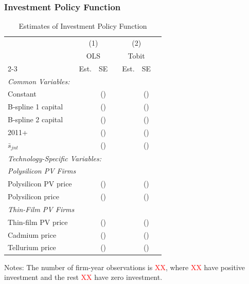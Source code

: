 \documentclass[12pt]{article}
\begin{document}
\subsubsection{Investment Policy Function}
\begin{table}[!h]
\centering
\caption{Estimates of Investment Policy Function}
\label{tab:est_investment_policy_func}
\begin{threeparttable}
\begin{tabularx}{0.75\textwidth}{Xcccccc}
\toprule
 & \multicolumn{2}{c}{(1)} && \multicolumn{2}{c}{(2)} \\
 & \multicolumn{2}{c}{OLS} && \multicolumn{2}{c}{Tobit} \\
\cmidrule{2-3} \cmidrule{5-6}
 & Est. & SE && Est. & SE \\
\midrule
\multicolumn{5}{l}{\textit{Common Variables:}} \\
Constant &   &  () &&  &  ()\\
B-spline 1 capital &   &  () &&  &  ()\\
B-spline 2 capital &   &  () &&  &  ()\\
2011+  &   &  () &&  & () \\
$\bar{s}_{jnt}$  &   &  () &&  & () \\
\multicolumn{5}{l}{\textit{Technology-Specific Variables:}} \\
\multicolumn{5}{l}{\textit{Polysilicon PV Firms}} \\
\quad Polysilicon PV price  &   &  () &&  &  ()\\
\quad Polysilicon price  &   &  () &&  &  ()\\
\multicolumn{5}{l}{\textit{Thin-Film PV Firms}} \\
\quad Thin-film PV price &   &  () &&  & () \\
\quad Cadmium price  &   &  () &&  & () \\
\quad Tellurium price  &   &  () &&  & () \\
\bottomrule
\end{tabularx}
\begin{tablenotes}
  \item  Notes: The number of firm-year observations is \textcolor{red}{XX}, where \textcolor{red}{XX} have positive investment and the rest \textcolor{red}{XX} have zero investment.
\end{tablenotes}
\end{threeparttable}
\end{table}


\pagebreak
\end{document}
